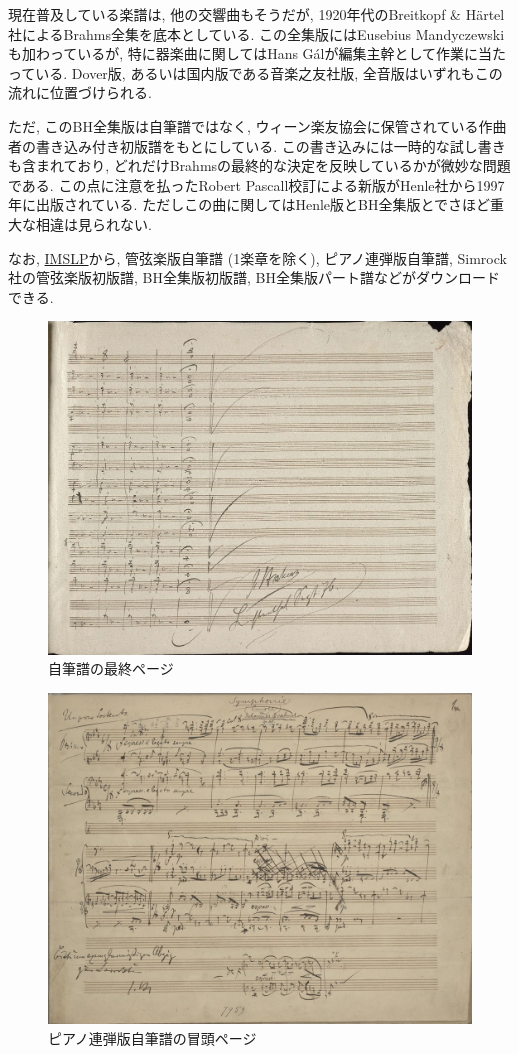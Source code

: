 現在普及している楽譜は, 他の交響曲もそうだが, 1920年代のBreitkopf \& Härtel社によるBrahms全集を底本としている.
この全集版にはEusebius Mandyczewskiも加わっているが, 特に器楽曲に関してはHans Gálが編集主幹として作業に当たっている.
Dover版, あるいは国内版である音楽之友社版\cite{ogt}, 全音版はいずれもこの流れに位置づけられる.

ただ, このBH全集版は自筆譜ではなく, ウィーン楽友協会に保管されている作曲者の書き込み付き初版譜をもとにしている.
この書き込みには一時的な試し書きも含まれており, どれだけBrahmsの最終的な決定を反映しているかが微妙な問題である.
この点に注意を払ったRobert Pascall校訂による新版がHenle社から1997年に出版されている\cite{henle}.
ただしこの曲に関してはHenle版とBH全集版とでさほど重大な相違は見られない.

なお, \href{http://imslp.org/wiki/Symphony_No.1,_Op.68_(Brahms,_Johannes)}{IMSLP}から,
管弦楽版自筆譜 (1楽章を除く), ピアノ連弾版自筆譜, Simrock社の管弦楽版初版譜, BH全集版初版譜, BH全集版パート譜などがダウンロードできる.

\begin{figure}[htbp]
	\centering
    \includegraphics[clip,width=12.0cm]{./figure/mov4-59.jpg}
	\caption{自筆譜の最終ページ}
    \label{fig: mov4-59}
\end{figure}

\begin{figure}[htbp]
	\centering
    \includegraphics[clip,width=12.0cm]{./figure/mov1(4H)-01.jpg}
	\caption{ピアノ連弾版自筆譜の冒頭ページ}
    \label{fig: mov1(4H)-01}
\end{figure}
